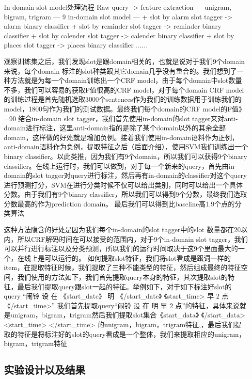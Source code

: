 \documentclass[master]{njuthesis}
\begin{document}
In-domain slot model处理流程
Raw query -> feature extraction --- unigram, bigram, trigram --- 9 in-domain slot model --- + slot by alarm slot tagger -> alarm binary classifier
 + slot by reminder slot tagger -> reminder binary classifier
 + slot by calender slot tagger -> calender binary classifier
 + slot by places slot tagger -> places binary classifier
......

观察训练集之后，我们发现slot是跟domain相关的，也就是说对于我们9个domain来说，每个domain 标注的slot种类跟其它domain几乎没有重合的。我们想到了一种方法就是为每一个domain训练出一个CRF model，由于每个domain中slot数量不多，我们可以容易的获取F值很高的CRF model，对于每个domain CRF model的训练过程是首先随机选取3000个sentences作为我们的训练数据用于训练我们的model，1800句作为我们的测试数据。最终我们每个domain的CRF model的F值》=90%
结合in-domain slot tagger，我们首先使用in-domain的slot tagger来对anti-domain进行标注，这里anti-domain指的是除了某个domain以外的其余全部domain，这样做的好处就是增加负例。接着我们使用in-domain语料作为正例，anti-domain语料作为负例，提取特征之后（后面介绍），使用SVM我们训练出一个binary classifier。以此类推，因为我们有9个domain，所以我们可以获得9个binary classifier。在线上运行时，我们可以做到，对于每一个新来的query，首先由in-domain的slot tagger对query进行标注，然后再有in-domain的classifier对这个query进行预测打分，SVM在进行分类时候不仅可以给出类别，同时可以给出一个具体分数。由于我们有9个binary classifier，所以我们可以得到9个分数，最终我们选取分数最高的作为prediction domain。 最后我们可以得到比baseline高1.9个点的分类算法

这种方法隐含的好处是因为我们每个in-domain的slot tagger中的slot 数量都在20以内，所以CRF解码时间在可以接受的范围内，对于9个in-domain slot tagger，我们可以并行进行标注以及分类预测，所以我们的运行时间取决于这9个里面最大的一个，在线上是可以运行的。
如何提取slot特征，我们将slot看成是跟词一样的item，在提取特征时候，我们提取了三种不能类型的特征，然后组成最终的特征空间，我们使用的方法如下，我们首先提取query本身的特征，其次提取slot的特征，最后我们提取query跟slot一起的特征。举例如下，对于如下标注好slot的query
“闹铃 设 在 《start\_date》 明 《/start\_date》 《start\_time>  早 2 点 《/start\_time>”
我们首先提取query“闹铃 设 在 明 早 2 点”的特征，具体来说就是unigram，bigram，trigram然后我们提取slot集合《start\_data》 《/start\_data> <start\_time> </start\_time> 的unigram，bigram，trigram特征,，最后我们提取的特征是将标注好的slot的query看成是一个整体，我们来提取相应的unigram，bigram，trigram特征

\subsection{实验设计以及结果}
\end{document}
